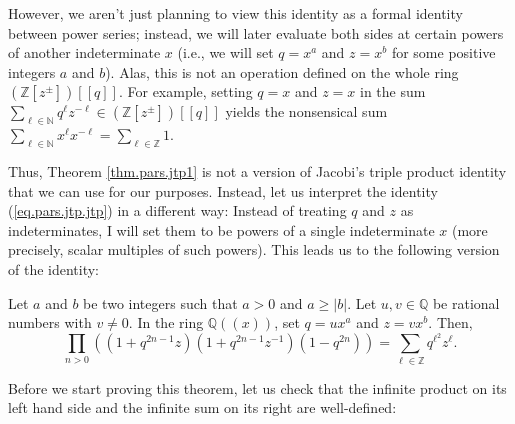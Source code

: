 However, we aren't just planning to view this identity as a formal identity
between power series; instead, we will later evaluate both sides at certain
powers of another indeterminate $x$ (i.e., we will set $q=x^{a}$ and $z=x^{b}$
for some positive integers $a$ and $b$). Alas, this is not an operation
defined on the whole ring $\left(  \mathbb{Z}\left[  z^{\pm}\right]  \right)
\left[  \left[  q\right]  \right]  $. For example, setting $q=x$ and $z=x$ in
the sum $\sum_{\ell\in\mathbb{N}}q^{\ell}z^{-\ell}\in\left(  \mathbb{Z}\left[
z^{\pm}\right]  \right)  \left[  \left[  q\right]  \right]  $ yields the
nonsensical sum $\sum_{\ell\in\mathbb{N}}x^{\ell}x^{-\ell}=\sum_{\ell
\in\mathbb{Z}}1$.

Thus, Theorem \ref{thm.pars.jtp1} is not a version of Jacobi's triple product
identity that we can use for our purposes. Instead, let us interpret the
identity (\ref{eq.pars.jtp.jtp}) in a different way: Instead of treating $q$
and $z$ as indeterminates, I will set them to be powers of a single
indeterminate $x$ (more precisely, scalar multiples of such powers). This
leads us to the following version of the identity:

\begin{theorem}
\label{thm.pars.jtp2}Let $a$ and $b$
be two integers such that $a>0$ and $a\geq\left\vert b\right\vert $. Let
$u,v\in\mathbb{Q}$ be rational numbers with $v\neq0$. In the ring
$\mathbb{Q}\left(  \left(  x\right)  \right)  $, set $q=ux^{a}$ and $z=vx^{b}%
$. Then,%
\[
\prod_{n>0}\left(  \left(  1+q^{2n-1}z\right)  \left(  1+q^{2n-1}%
z^{-1}\right)  \left(  1-q^{2n}\right)  \right)  =\sum_{\ell\in\mathbb{Z}%
}q^{\ell^{2}}z^{\ell}.
\]

\end{theorem}

Before we start proving this theorem, let us check that the infinite product
on its left hand side and the infinite sum on its right are well-defined:

